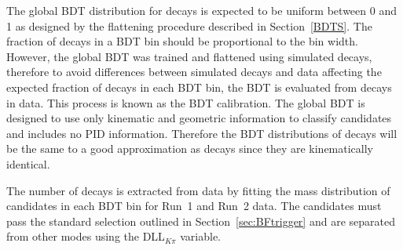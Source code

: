 The global BDT distribution for \bmumu decays is expected to be uniform between 0 and 1 as designed by the flattening procedure described in Section~\ref{BDTS}. The fraction of \bmumu decays in a BDT bin should be proportional to the bin width. However, the global BDT was trained and flattened using simulated decays, therefore to avoid differences between simulated decays and data affecting the expected fraction of \bmumu decays in each BDT bin, the BDT \pdf is evaluated from \bdkpi decays in data. This process is known as the BDT calibration.
The global BDT is designed to use only kinematic and geometric information to classify candidates and includes no PID information. Therefore the BDT distributions of \bdkpi decays will be the same to a good approximation as \bmumu decays since they are kinematically identical. %

The number of \bdkpi decays is extracted from data by fitting the mass distribution of \bdkpi candidates in each BDT bin for Run~1 and Run~2 data. The \bdkpi candidates must pass the standard \bhh selection outlined in Section~\ref{sec:BFtrigger} and are separated from other \bhh modes using the DLL$_{K\pi}$ variable. %

